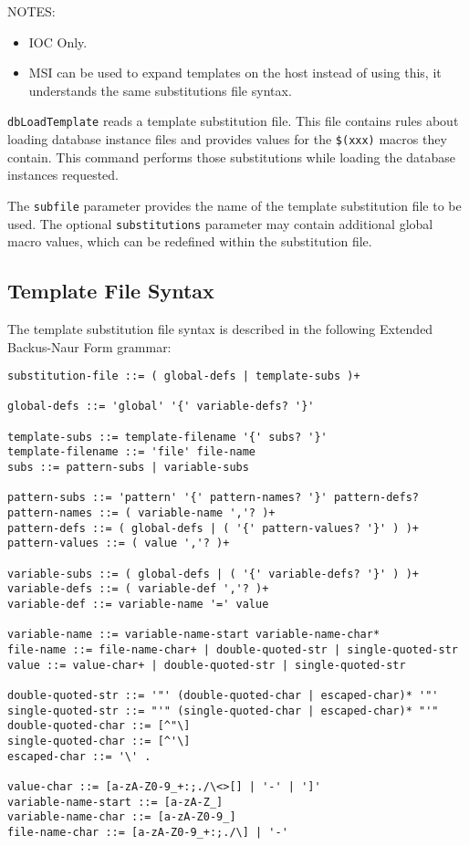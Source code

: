 NOTES:

\begin{itemize}
\item IOC Only.

\item MSI can be used to expand templates on the host instead of using this, it understands the same substitutions file syntax.
\end{itemize}

\verb|dbLoadTemplate| reads a template substitution file.
This file contains rules about loading database instance files and provides values for the \verb|$(xxx)| macros they contain.
This command performs those substitutions while loading the database instances requested.

The \verb|subfile| parameter provides the name of the template substitution file to be used.
The optional \verb|substitutions| parameter may contain additional global macro values, which can be redefined within the substitution file.

\subsection{Template File Syntax}

The template substitution file syntax is described in the following Extended Backus-Naur Form grammar:

\begin{verbatim}
substitution-file ::= ( global-defs | template-subs )+

global-defs ::= 'global' '{' variable-defs? '}'

template-subs ::= template-filename '{' subs? '}'
template-filename ::= 'file' file-name
subs ::= pattern-subs | variable-subs

pattern-subs ::= 'pattern' '{' pattern-names? '}' pattern-defs?
pattern-names ::= ( variable-name ','? )+
pattern-defs ::= ( global-defs | ( '{' pattern-values? '}' ) )+
pattern-values ::= ( value ','? )+

variable-subs ::= ( global-defs | ( '{' variable-defs? '}' ) )+
variable-defs ::= ( variable-def ','? )+
variable-def ::= variable-name '=' value

variable-name ::= variable-name-start variable-name-char*
file-name ::= file-name-char+ | double-quoted-str | single-quoted-str
value ::= value-char+ | double-quoted-str | single-quoted-str

double-quoted-str ::= '"' (double-quoted-char | escaped-char)* '"'
single-quoted-str ::= "'" (single-quoted-char | escaped-char)* "'"
double-quoted-char ::= [^"\]
single-quoted-char ::= [^'\]
escaped-char ::= '\' .

value-char ::= [a-zA-Z0-9_+:;./\<>[] | '-' | ']'
variable-name-start ::= [a-zA-Z_]
variable-name-char ::= [a-zA-Z0-9_]
file-name-char ::= [a-zA-Z0-9_+:;./\] | '-'
\end{verbatim}

